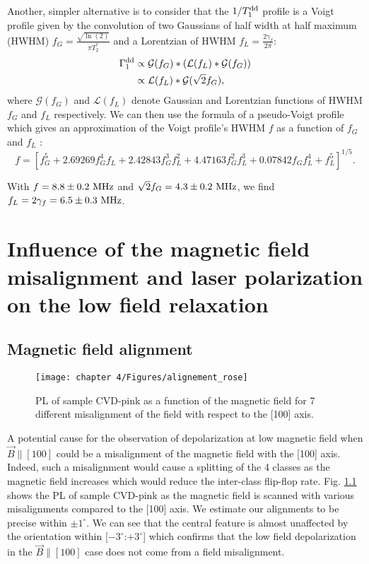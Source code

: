 \documentclass[a4paper, 11pt]{report}
\begin{document}
Another, simpler alternative is to consider that the $1/T_1^{\rm dd}$ profile is a Voigt profile given by the convolution of two Gaussians of half width at half maximum (HWHM) $f_G=\frac{\sqrt{\ln (2)}}{\pi T_2^*}$ and a Lorentzian of HWHM $f_L=\frac{2 \gamma_f}{2 \pi}$:
\begin{align*}
\Gamma_1^{\rm dd}&\propto \mathcal{G}(f_G)*(\mathcal{L}(f_L)*\mathcal{G}(f_G)) \\
&\propto \mathcal{L}(f_L)*\mathcal{G}(\sqrt{2} f_G),
\end{align*}
where $\mathcal{G}(f_G)$ and $\mathcal{L}(f_L)$ denote Gaussian and Lorentzian functions of HWHM $f_G$ and $f_L$ respectively.
We can then use the formula of a pseudo-Voigt profile which gives an approximation of the Voigt profile's HWHM $f$ as a function of $f_G$ and $f_L$ \citep{ida2000extended}:
\begin{equation}
f = [f_G^5 + 2.69269 f_G^4 f_L + 2.42843 f_G^3 f_L^2 + 4.47163 f_G^2 f_L^3 + 0.07842 f_G f_L^4 + f_L^5]^{1/5}.
\end{equation}

With $f=8.8 \pm 0.2\ \rm MHz$ and $\sqrt{2}f_G=4.3 \pm 0.2\ \rm MHz$, we find $f_L= 2 \gamma_f =6.5 \pm 0.3\ \rm MHz$.

\chapter{Influence of the magnetic field misalignment and laser polarization on the low field relaxation}
\label{Appendix autres causes}
\section{Magnetic field alignment}
\begin{figure}[h]
\centering
\texttt{[image: chapter 4/Figures/alignement\_rose]}
\caption{PL of sample CVD-pink as a function of the magnetic field for 7 different misalignment of the field with respect to the [100] axis.}
\label{alignement rose}
\end{figure}

A potential cause for the observation of depolarization at low magnetic field when $\vec{B} \parallel [100]$ could be a misalignment of the magnetic field with the [100] axis. Indeed, such a misalignment would cause a splitting of the 4 classes as the magnetic field increases which would reduce the inter-class flip-flop rate. %
Fig. \ref{alignement rose} shows the PL of sample CVD-pink as the magnetic field is scanned with various misalignments compared to the [100] axis. We estimate our alignments to be precise within $\pm 1^\circ$. We can see that the central feature is almost unaffected by the orientation within [$-3^\circ$:$+3^\circ$] which confirms that the low field depolarization in the $\vec{B} \parallel [100]$ case does not come from a field misalignment.
\end{document}

